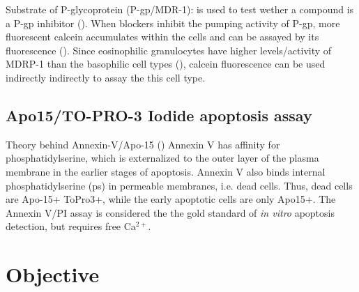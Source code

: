 Substrate of P-glycoprotein (P-gp/MDR-1): is used to test wether a compound is a P-gp inhibitor (\cite{Di2016}). When blockers inhibit the
pumping activity of P-gp, more fluorescent calcein accumulates within the cells and can be assayed by its fluorescence (\cite{Köhler2003}).
Since eosinophilic granulocytes have higher levels/activity of MDRP-1 than the basophilic cell types (\cite{Rioult2014}), calcein fluorescence can be used indirectly indirectly to assay the this cell type.




\subsection{Apo15/TO-PRO-3 Iodide apoptosis assay}
Theory behind Annexin-V/Apo-15 (\cite{Barth2020}) Annexin V has affinity for phosphatidylserine, which is externalized to the outer layer of the plasma membrane in the earlier stages of apoptosis. Annexin V also binds internal phosphatidylserine (\acrshort{ps}) in permeable membranes, i.e. dead cells. Thus, dead cells are Apo-15+ ToPro3+, while the early apoptotic cells are only Apo15+. The Annexin V/PI assay is considered the the gold standard of \emph{in vitro} apoptosis detection, but requires free Ca$^{2+}$.


\section{Objective}
